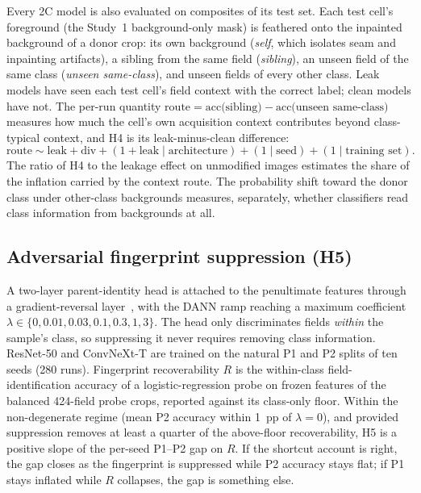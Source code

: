 \documentclass[11pt]{article}
\begin{document}
Every 2C model is also evaluated on composites of its test set. Each test cell's
foreground (the Study~1 background-only mask) is feathered onto the inpainted background
of a donor crop: its own background (\emph{self}, which isolates seam and inpainting
artifacts), a sibling from the same field (\emph{sibling}), an unseen field of the same
class (\emph{unseen same-class}), and unseen fields of every other class. Leak models have
seen each test cell's field context with the correct label; clean models have not. The
per-run quantity $\text{route} = \text{acc(sibling)} - \text{acc(unseen same-class)}$
measures how much the cell's own acquisition context contributes beyond class-typical
context, and H4 is its leak-minus-clean difference:
\begin{equation}
\text{route} \sim \text{leak} + \text{div} + (1+\text{leak}\mid\text{architecture}) + (1\mid\text{seed}) + (1\mid\text{training set}).
\end{equation}
The ratio of H4 to the leakage effect on unmodified images estimates the share of the
inflation carried by the context route. The probability shift toward the donor class
under other-class backgrounds measures, separately, whether classifiers read class
information from backgrounds at all.

\subsection{Adversarial fingerprint suppression (H5)}
\label{sec:grl}

A two-layer parent-identity head is attached to the penultimate features through a
gradient-reversal layer~\citep{ganin2015backprop,ganin2016dann}, with the DANN ramp
reaching a maximum coefficient $\lambda\in\{0,\allowbreak 0.01,\allowbreak 0.03,\allowbreak 0.1,\allowbreak 0.3,\allowbreak 1,\allowbreak 3\}$. The head only
discriminates fields \emph{within} the sample's class, so suppressing it never requires
removing class information. ResNet-50 and ConvNeXt-T are trained on the natural P1 and P2
splits of ten seeds (280 runs). Fingerprint recoverability $R$ is the within-class
field-identification accuracy of a logistic-regression probe on frozen features of the
balanced 424-field probe crops, reported against its class-only floor. Within the
non-degenerate regime (mean P2 accuracy within 1~pp of $\lambda=0$), and provided
suppression removes at least a quarter of the above-floor recoverability, H5 is a positive
slope of the per-seed P1--P2 gap on $R$. If the shortcut account is right, the gap closes
as the fingerprint is suppressed while P2 accuracy stays flat; if P1 stays inflated while
$R$ collapses, the gap is something else.
\end{document}
